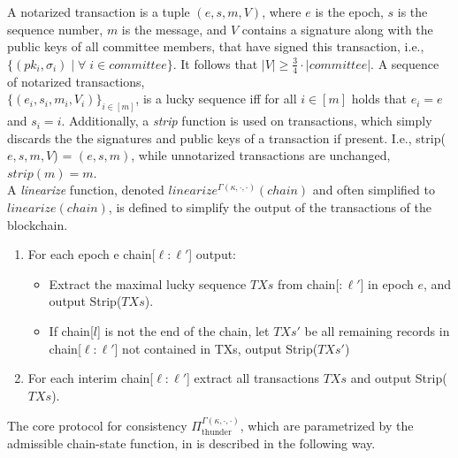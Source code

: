 A notarized transaction is a tuple $(e, s, m, V)$, where $e$ is the epoch, $s$ is the sequence number, $m$ is the message, and $V$ contains a signature along with the public keys of all committee members, that have signed this transaction, i.e., $\{(pk_i, \sigma_i) \; | \; \forall \; i \in committee\}$. It follows that $|V| \geq \frac{3}{4} \cdot |committee|$. A sequence of notarized transactions, \\ $\{(e_i, s_i, m_i, V_i)\}_{i \in [m]}$, is a lucky sequence iff for all $i \in [m]$ holds that $e_i = e$ and $s_i = i$. Additionally, a \emph{strip} function is used on transactions, which simply discards the the signatures and public keys of a transaction if present. I.e., strip($e, s, m, V$) = $(e, s, m)$, while unnotarized transactions are unchanged, $strip(m) = m$. \\


A \emph{linearize} function, denoted $linearize^{\Gamma(\kappa, \cdot, \cdot)}(chain)$ and often simplified to $linearize(chain)$, is defined to simplify the output of the transactions of the blockchain. 
\begin{enumerate}
    \item For each epoch e chain[$\ell: \ell'$] output:
    \begin{itemize}
        \item Extract the maximal lucky sequence $TXs$ from chain[$:\ell'$] in epoch $e$, and output Strip($TXs$).
        \item If chain[$l$] is not the end of the chain, let $TXs'$ be all remaining records in chain[$\ell:\ell'$] not contained in TXs, output Strip($TXs'$)
    \end{itemize}
    \item For each interim chain[$\ell : \ell'$] extract all transactions $TXs$ and output Strip($TXs$). 
\end{enumerate}

The core protocol for consistency $\Pi_\text{thunder}^{\Gamma(\kappa, \cdot, \cdot)}$, which are parametrized by the admissible chain-state function, in \cite{thunderella} is described in the following way.


